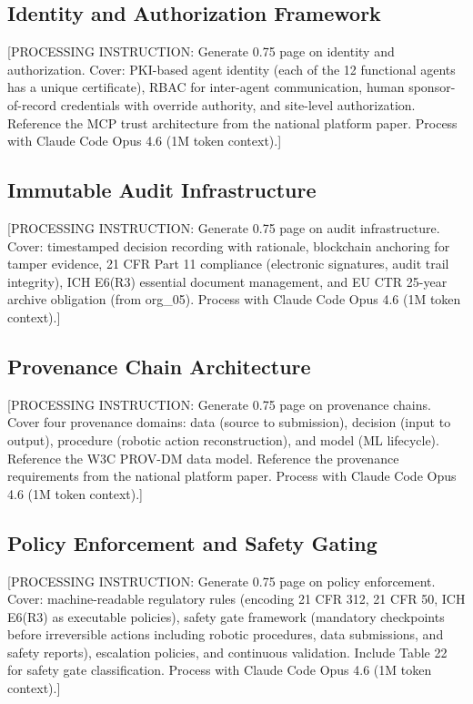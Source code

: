 \subsection{Identity and Authorization Framework}

[PROCESSING INSTRUCTION: Generate 0.75 page on identity and authorization. Cover: PKI-based
agent identity (each of the 12 functional agents has a unique certificate), RBAC for
inter-agent communication, human sponsor-of-record credentials with override authority,
and site-level authorization. Reference the MCP trust architecture from the national
platform paper. Process with Claude Code Opus 4.6 (1M token context).]

\subsection{Immutable Audit Infrastructure}

[PROCESSING INSTRUCTION: Generate 0.75 page on audit infrastructure. Cover: timestamped
decision recording with rationale, blockchain anchoring for tamper evidence, 21 CFR Part 11
compliance (electronic signatures, audit trail integrity), ICH E6(R3) essential document
management, and EU CTR 25-year archive obligation (from org\_05).
Process with Claude Code Opus 4.6 (1M token context).]

\subsection{Provenance Chain Architecture}

[PROCESSING INSTRUCTION: Generate 0.75 page on provenance chains. Cover four provenance
domains: data (source to submission), decision (input to output), procedure (robotic
action reconstruction), and model (ML lifecycle). Reference the W3C PROV-DM data model.
Reference the provenance requirements from the national platform paper.
Process with Claude Code Opus 4.6 (1M token context).]

\subsection{Policy Enforcement and Safety Gating}

[PROCESSING INSTRUCTION: Generate 0.75 page on policy enforcement. Cover: machine-readable
regulatory rules (encoding 21 CFR 312, 21 CFR 50, ICH E6(R3) as executable policies),
safety gate framework (mandatory checkpoints before irreversible actions including robotic
procedures, data submissions, and safety reports), escalation policies, and continuous
validation. Include Table 22 for safety gate classification.
Process with Claude Code Opus 4.6 (1M token context).]
